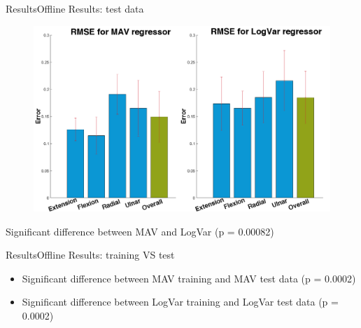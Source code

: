 \documentclass[10pt]{beamer}
\begin{document}
\begin{frame}{Results}{Offline Results: test data}
\begin{figure}
	\includegraphics[scale=0.27]{figures/RMSEBarPlotNewData.png}
\end{figure}
Significant difference between MAV and LogVar (p = 0.00082)
\end{frame}

\begin{frame}{Results}{Offline Results: training VS test}
\begin{itemize}
	\item Significant difference between MAV training and MAV test data (p = 0.0002)
	\item Significant difference between LogVar training and LogVar test data (p = 0.0002)
\end{itemize}
\end{frame}

\end{document}
